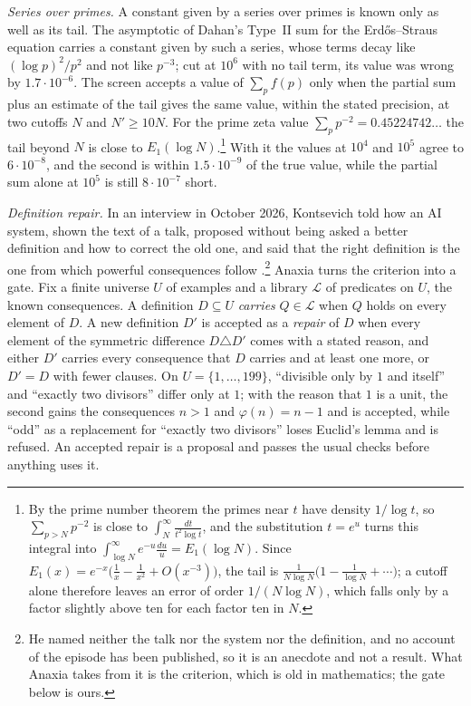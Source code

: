 \emph{Series over primes.} A constant given by a series over primes is known only as well as its tail. The asymptotic of Dahan's Type~II sum for the Erd\H{o}s--Straus equation \cite{Dah26} carries a constant given by such a series, whose terms decay like $(\log p)^{2}/p^{2}$ and not like $p^{-3}$; cut at $10^{6}$ with no tail term, its value was wrong by $1.7\cdot10^{-6}$. The screen accepts a value of $\sum_{p}f(p)$ only when the partial sum plus an estimate of the tail gives the same value, within the stated precision, at two cutoffs $N$ and $N'\ge10N$. For the prime zeta value $\sum_{p}p^{-2}=0.45224742\ldots$ the tail beyond $N$ is close to $E_{1}(\log N)$.\footnote{By the prime number theorem the primes near $t$ have density $1/\log t$, so $\sum_{p>N}p^{-2}$ is close to $\int_{N}^{\infty}\frac{dt}{t^{2}\log t}$, and the substitution $t=e^{u}$ turns this integral into $\int_{\log N}^{\infty}e^{-u}\frac{du}{u}=E_{1}(\log N)$. Since $E_{1}(x)=e^{-x}\bigl(\frac1x-\frac1{x^{2}}+O(x^{-3})\bigr)$, the tail is $\frac{1}{N\log N}\bigl(1-\frac{1}{\log N}+\cdots\bigr)$; a cutoff alone therefore leaves an error of order $1/(N\log N)$, which falls only by a factor slightly above ten for each factor ten in $N$.} With it the values at $10^{4}$ and $10^{5}$ agree to $6\cdot10^{-8}$, and the second is within $1.5\cdot10^{-9}$ of the true value, while the partial sum alone at $10^{5}$ is still $8\cdot10^{-7}$ short.

\emph{Definition repair.} In an interview in October 2026, Kontsevich told how an AI system, shown the text of a talk, proposed without being asked a better definition and how to correct the old one, and said that the right definition is the one from which powerful consequences follow \cite{Kon26}.\footnote{He named neither the talk nor the system nor the definition, and no account of the episode has been published, so it is an anecdote and not a result. What Anaxia takes from it is the criterion, which is old in mathematics; the gate below is ours.} Anaxia turns the criterion into a gate. Fix a finite universe $U$ of examples and a library $\mathcal L$ of predicates on $U$, the known consequences. A definition $D\subseteq U$ \emph{carries} $Q\in\mathcal L$ when $Q$ holds on every element of $D$. A new definition $D'$ is accepted as a \emph{repair} of $D$ when every element of the symmetric difference $D\triangle D'$ comes with a stated reason, and either $D'$ carries every consequence that $D$ carries and at least one more, or $D'=D$ with fewer clauses. On $U=\{1,\dots,199\}$, ``divisible only by $1$ and itself'' and ``exactly two divisors'' differ only at $1$; with the reason that $1$ is a unit, the second gains the consequences $n>1$ and $\varphi(n)=n-1$ and is accepted, while ``odd'' as a replacement for ``exactly two divisors'' loses Euclid's lemma and is refused. An accepted repair is a proposal and passes the usual checks before anything uses it.

